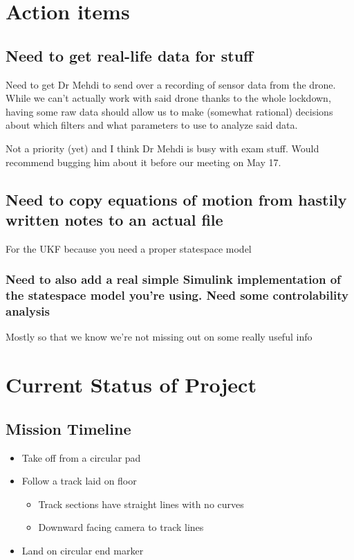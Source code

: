 \documentclass[unrestricted]{meetingnotesminutes}
\begin{document}
\section{Action items}
\label{sec:orgf1856e3}
\subsection{Need to get real-life data for stuff}
\label{sec:org5097b67}
Need to get Dr Mehdi to send over a recording of sensor data from the drone. While we can't actually work with said drone thanks to the whole lockdown, having some raw data should allow us to make (somewhat rational) decisions about which filters and what parameters to use to analyze said data.

Not a priority (yet) and I think Dr Mehdi is busy with exam stuff. Would recommend bugging him about it before our meeting on May 17.

\subsection{Need to copy equations of motion from hastily written notes to an actual file}
\label{sec:org4bf350f}

For the UKF because you need a proper statespace model
\subsubsection{Need to also add a real simple Simulink implementation of the statespace model you're using. Need some controlability analysis}
\label{sec:orgc0e0414}

Mostly so that we know we're not missing out on some really useful info

\section{Current Status of Project}
\label{sec:org4444499}
\subsection{Mission Timeline}
\label{sec:orga232f7c}

\begin{itemize}
\item Take off from a circular pad
\item Follow a track laid on floor
\begin{itemize}
\item Track sections have straight lines with no curves
\item Downward facing camera to track lines
\end{itemize}
\item Land on circular end marker
\end{itemize}
\end{document}
